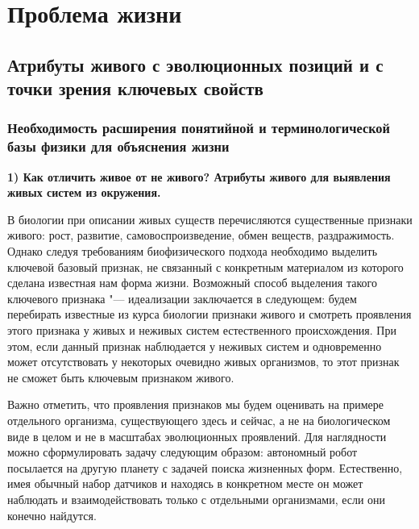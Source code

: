 \documentclass[12pt,a4paper,oneside]{book}
\begin{document}
\newpage
\chapter{Проблема жизни}

\section{Атрибуты живого с эволюционных позиций и с точки зрения ключевых свойств}


\subsection{Необходимость расширения понятийной и терминологической базы физики для объяснения жизни}


{\bf 1) Как отличить живое от не живого? Атрибуты живого для выявления живых систем из окружения.}

В биологии при описании живых существ перечисляются существенные признаки живого: рост, развитие, самовоспроизведение, обмен веществ, раздражимость. Однако следуя требованиям биофизического подхода необходимо выделить ключевой базовый признак, не связанный с конкретным материалом из которого сделана известная нам форма жизни. Возможный способ выделения такого ключевого признака "--- идеализации заключается в следующем: будем перебирать известные из курса биологии признаки живого и смотреть проявления этого признака у живых и неживых систем естественного происхождения. При этом, если данный признак наблюдается у неживых систем и одновременно может отсутствовать у некоторых очевидно живых организмов, то этот признак не сможет быть ключевым признаком живого.

Важно отметить, что проявления признаков мы будем оценивать на примере отдельного организма, существующего здесь и сейчас, а не на биологическом виде в целом и не в масштабах эволюционных проявлений. Для наглядности можно сформулировать задачу следующим образом: автономный робот посылается на другую планету с задачей поиска жизненных форм. Естественно, имея обычный набор датчиков и находясь в конкретном месте он может наблюдать и взаимодействовать только с отдельными организмами, если они конечно найдутся.
\end{document}
